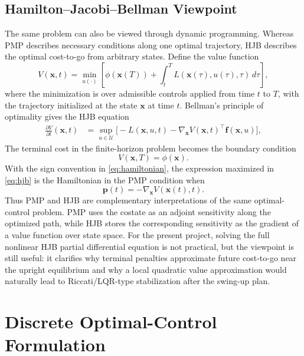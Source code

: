 \documentclass[conference]{IEEEtran}
\begin{document}
\subsection{Hamilton--Jacobi--Bellman Viewpoint}
The same problem can also be viewed through dynamic programming. Whereas PMP describes necessary conditions along one optimal trajectory, HJB describes the optimal cost-to-go from arbitrary states. Define the value function
\begin{equation}
V(\bm{x},t)=
\min_{u(\cdot)}
\left[
\phi(\bm{x}(T))
+
\int_t^T L(\bm{x}(\tau),u(\tau),\tau)\,d\tau
\right],
\label{eq:value_function}
\end{equation}
where the minimization is over admissible controls applied from time $t$ to $T$, with the trajectory initialized at the state $\bm{x}$ at time $t$. Bellman's principle of optimality gives the HJB equation
\begin{equation}
\begin{aligned}
\frac{\partial V}{\partial t}(\bm{x},t)
&=
\sup_{u\in\mathcal{U}}
\Big[
-L(\bm{x},u,t) - \nabla_{\bm{x}}V(\bm{x},t)^{\top}\bm{f}(\bm{x},u)
\Big],
\end{aligned}
\label{eq:hjb}
\end{equation}
The terminal cost in the finite-horizon problem becomes the boundary condition
\begin{equation}
V(\bm{x},T)=\phi(\bm{x}).
\end{equation}
With the sign convention in \eqref{eq:hamiltonian}, the expression maximized in \eqref{eq:hjb} is the Hamiltonian in the PMP condition when
\begin{equation}
\bm{p}(t)=-\nabla_{\bm{x}}V(\bm{x}(t),t).
\end{equation}
Thus PMP and HJB are complementary interpretations of the same optimal-control problem. PMP uses the costate as an adjoint sensitivity along the optimized path, while HJB stores the corresponding sensitivity as the gradient of a value function over state space. For the present project, solving the full nonlinear HJB partial differential equation is not practical, but the viewpoint is still useful: it clarifies why terminal penalties approximate future cost-to-go near the upright equilibrium and why a local quadratic value approximation would naturally lead to Riccati/LQR-type stabilization after the swing-up plan.

\section{Discrete Optimal-Control Formulation}
\end{document}
